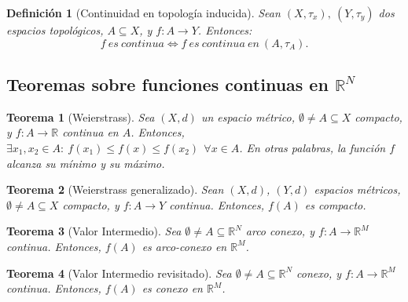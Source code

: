\documentclass[11pt, a4paper, titlepage]{article}
\let\epsilon\upvarepsilon
\theoremstyle{theorem-style}
\newtheorem*{nth}{Teorema}
\newtheorem*{nprop}{Proposición}
\theoremstyle{definition-style}
\newtheorem*{ndef}{Definición}
\theoremstyle{remark-style}
\theoremstyle{example-style}
\newenvironment{nlist}
{\begin{enumerate}
\renewcommand\labelenumi{(\emph{\roman{enumi})}}}
{\end{enumerate}}
\begin{document}
\begin{ndef}[Continuidad en topología inducida]
Sean $(X,\tau_x),\ (Y,\tau_y)$ dos espacios topológicos, $A\subseteq X$, y $f:A\longrightarrow Y$. Entonces: $$f\ es\ continua \iff f\ es\ continua\ en\ (A,\tau_A).$$
\end{ndef}



\subsection{Teoremas sobre funciones continuas en $\mathbb{R}^N$}



\begin{nth}[Weierstrass]
Sea $(X,d)$ un espacio métrico, $\emptyset \ne A \subseteq X$ compacto, y $f:A \longrightarrow \mathbb{R}$ continua en $A$. Entonces, $\exists x_1,x_2 \in A: \ f(x_1)\le f(x) \le f(x_2)\ \ \forall x\in A$. En otras palabras, la función $f$ alcanza su mínimo y su máximo.
\end{nth}



\begin{nth}[Weierstrass generalizado]
Sean $(X,d)$, $(Y,d)$ espacios métricos, $\emptyset \ne A \subseteq X$ compacto, y $f: A \longrightarrow Y$ continua. Entonces, $f(A)$ es compacto.
\end{nth}



\begin{nth}[Valor Intermedio]
Sea $\emptyset \ne A \subseteq \mathbb{R}^N$ arco conexo, y $f: A \longrightarrow \mathbb{R}^M$ continua. Entonces, $f(A)$ es arco-conexo en $\mathbb{R}^M$.
\end{nth}



\begin{nth}[Valor Intermedio revisitado]
Sea $\emptyset \ne A\subseteq \mathbb{R}^N$ conexo, y $f:A \longrightarrow \mathbb{R}^M$ continua. Entonces, $f(A)$ es conexo en $\mathbb{R}^M$.
\end{nth}

















\end{document}
